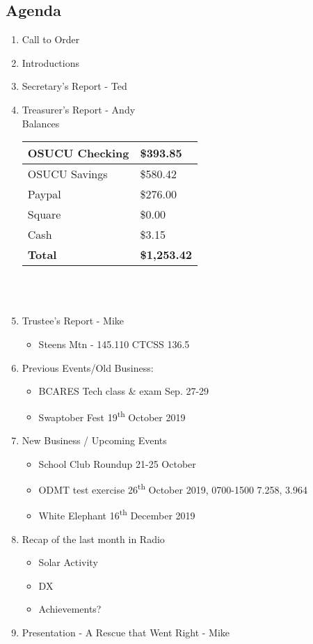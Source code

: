\documentclass[letter,11pt]{extarticle}
\begin{document}
	\subsection*{Agenda}
	\begin{enumerate}
		\item Call to Order
		\item Introductions
		\item Secretary's Report - Ted
		\item Treasurer's Report - Andy \\
				Balances 
			\begin{tabular}{|l|l|} \hline
				OSUCU Checking & \$393.85 \\ \hline
				OSUCU Savings & \$580.42 \\ \hline
				Paypal & \$276.00 \\ \hline
				Square & \$0.00 \\ \hline
				Cash & \$3.15 \\ \hline
				\textbf{Total} & \textbf{\$1,253.42} \\ \hline
			\end{tabular} \\ \\
		\item Trustee's Report - Mike
			\begin{itemize}
				\item Steens Mtn - 145.110 CTCSS 136.5
			\end{itemize}
		\item Previous Events/Old Business:
		\begin{itemize}
			\item BCARES Tech class \& exam Sep. 27-29
			\item Swaptober Fest 19\textsuperscript{th} October 2019	
		\end{itemize}
			
		\item  New Business / Upcoming Events
			\begin{itemize}
				\item School Club Roundup 21-25 October
				\item ODMT test exercise 26\textsuperscript{th} October 2019, 0700-1500 7.258, 3.964
				\item White Elephant 16\textsuperscript{th} December 2019
			\end{itemize}
		\item Recap of the last month in Radio
			\begin{itemize}
				\item Solar Activity
				\item DX
				\item Achievements?
			\end{itemize}
		\item  Presentation - A Rescue that Went Right - Mike

	\end{enumerate}
\end{document}

